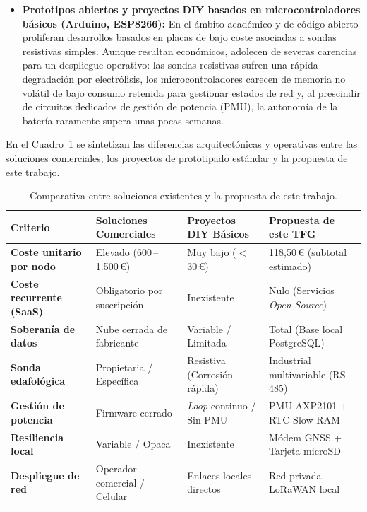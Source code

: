 \begin{itemize}
    \item \textbf{Prototipos abiertos y proyectos DIY basados en microcontroladores básicos (Arduino, ESP8266):} En el ámbito académico y de código abierto proliferan desarrollos basados en placas de bajo coste asociadas a sondas resistivas simples. Aunque resultan económicos, adolecen de severas carencias para un despliegue operativo: las sondas resistivas sufren una rápida degradación por electrólisis, los microcontroladores carecen de memoria no volátil de bajo consumo retenida para gestionar estados de red y, al prescindir de circuitos dedicados de gestión de potencia (PMU), la autonomía de la batería raramente supera unas pocas semanas.
\end{itemize}

En el Cuadro~\ref{tab:comparativa_aplicaciones} se sintetizan las diferencias arquitectónicas y operativas entre las soluciones comerciales, los proyectos de prototipado estándar y la propuesta de este trabajo.

\begin{table}[htbp]
\centering
\small
\begin{tabular}{p{3.8cm} p{3.6cm} p{3.4cm} p{4cm}}
\hline
\textbf{Criterio} & \textbf{Soluciones Comerciales} & \textbf{Proyectos DIY Básicos} & \textbf{Propuesta de este TFG} \\ \hline
\textbf{Coste unitario por nodo} & Elevado (600\,--\,1.500\,€) & Muy bajo ($<$ 30\,€) & 118,50\,€ (subtotal estimado) \\
\textbf{Coste recurrente (SaaS)} & Obligatorio por suscripción & Inexistente & Nulo (Servicios \textit{Open Source}) \\
\textbf{Soberanía de datos} & Nube cerrada de fabricante & Variable / Limitada & Total (Base local PostgreSQL) \\
\textbf{Sonda edafológica} & Propietaria / Específica & Resistiva (Corrosión rápida) & Industrial multivariable (RS-485) \\
\textbf{Gestión de potencia} & Firmware cerrado & \textit{Loop} continuo / Sin PMU & PMU AXP2101 + RTC Slow RAM \\
\textbf{Resiliencia local} & Variable / Opaca & Inexistente & Módem GNSS + Tarjeta microSD \\
\textbf{Despliegue de red} & Operador comercial / Celular & Enlaces locales directos & Red privada LoRaWAN local \\ \hline
\end{tabular}
\caption{Comparativa entre soluciones existentes y la propuesta de este trabajo.}
\label{tab:comparativa_aplicaciones}
\end{table}

